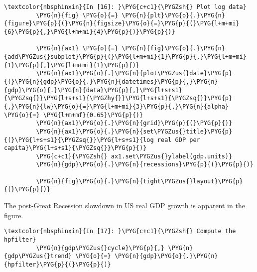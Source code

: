\documentclass[letterpaper,10pt,openany,oneside,english]{sphinxmanual}
\begin{document}
\begin{Verbatim}[commandchars=\\\{\}]
\textcolor{nbsphinxin}{In [16]: }\PYG{c+c1}{\PYGZsh{} Plot log data}
         \PYG{n}{fig} \PYG{o}{=} \PYG{n}{plt}\PYG{o}{.}\PYG{n}{figure}\PYG{p}{(}\PYG{n}{figsize}\PYG{o}{=}\PYG{p}{(}\PYG{l+m+mi}{6}\PYG{p}{,}\PYG{l+m+mi}{4}\PYG{p}{)}\PYG{p}{)}
         
         \PYG{n}{ax1} \PYG{o}{=} \PYG{n}{fig}\PYG{o}{.}\PYG{n}{add\PYGZus{}subplot}\PYG{p}{(}\PYG{l+m+mi}{1}\PYG{p}{,}\PYG{l+m+mi}{1}\PYG{p}{,}\PYG{l+m+mi}{1}\PYG{p}{)}
         \PYG{n}{ax1}\PYG{o}{.}\PYG{n}{plot\PYGZus{}date}\PYG{p}{(}\PYG{n}{gdp}\PYG{o}{.}\PYG{n}{datetimes}\PYG{p}{,}\PYG{n}{gdp}\PYG{o}{.}\PYG{n}{data}\PYG{p}{,}\PYG{l+s+s1}{\PYGZsq{}}\PYG{l+s+s1}{\PYGZhy{}}\PYG{l+s+s1}{\PYGZsq{}}\PYG{p}{,}\PYG{n}{lw}\PYG{o}{=}\PYG{l+m+mi}{3}\PYG{p}{,}\PYG{n}{alpha} \PYG{o}{=} \PYG{l+m+mf}{0.65}\PYG{p}{)}
         \PYG{n}{ax1}\PYG{o}{.}\PYG{n}{grid}\PYG{p}{(}\PYG{p}{)}
         \PYG{n}{ax1}\PYG{o}{.}\PYG{n}{set\PYGZus{}title}\PYG{p}{(}\PYG{l+s+s1}{\PYGZsq{}}\PYG{l+s+s1}{log real GDP per capita}\PYG{l+s+s1}{\PYGZsq{}}\PYG{p}{)}
         \PYG{c+c1}{\PYGZsh{} ax1.set\PYGZus{}ylabel(gdp.units)}
         \PYG{n}{gdp}\PYG{o}{.}\PYG{n}{recessions}\PYG{p}{(}\PYG{p}{)}
         
         \PYG{n}{fig}\PYG{o}{.}\PYG{n}{tight\PYGZus{}layout}\PYG{p}{(}\PYG{p}{)}
\end{Verbatim}

\noindent{}

The post-Great Recession slowdown in US real GDP growth is apparent in
the figure.

\begin{Verbatim}[commandchars=\\\{\}]
\textcolor{nbsphinxin}{In [17]: }\PYG{c+c1}{\PYGZsh{} Compute the hpfilter}
         \PYG{n}{gdp\PYGZus{}cycle}\PYG{p}{,} \PYG{n}{gdp\PYGZus{}trend} \PYG{o}{=} \PYG{n}{gdp}\PYG{o}{.}\PYG{n}{hpfilter}\PYG{p}{(}\PYG{p}{)}
\end{Verbatim}
\end{document}
